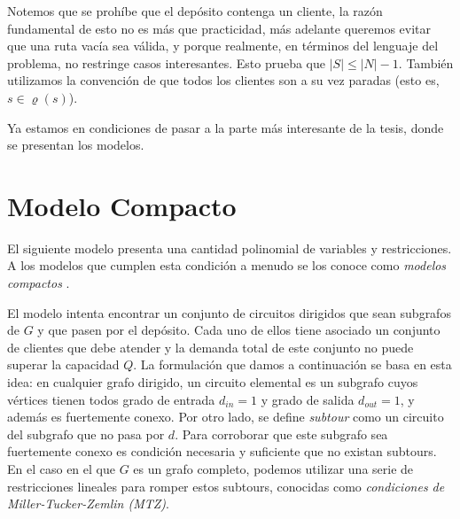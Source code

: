 Notemos que se prohíbe que el depósito contenga un cliente, la razón fundamental de esto no es más que practicidad, más adelante queremos evitar que una ruta vacía sea válida, y porque realmente, en términos del lenguaje del problema, no restringe casos interesantes. Esto prueba que $|S| \leq |N|-1$. También utilizamos la convención de que todos los clientes son a su vez paradas (esto es, $s \in \varrho(s)$). 

Ya estamos en condiciones de pasar a la parte más interesante de la tesis, donde se presentan los modelos.


\section{Modelo Compacto}
\label{section:compacto}

El siguiente modelo presenta una cantidad polinomial de variables y restricciones. A los modelos que cumplen esta condición a menudo se los conoce como \emph{modelos compactos} \cite[p.3]{lancia-serafini}.

El modelo intenta encontrar un conjunto de circuitos dirigidos que sean subgrafos de $G$ y que pasen por el depósito. Cada uno de ellos tiene asociado un conjunto de clientes que debe atender y la demanda total de este conjunto no puede superar la capacidad $Q$. La formulación que damos a continuación se basa en esta idea: en cualquier grafo dirigido, un circuito elemental es un subgrafo cuyos vértices tienen todos grado de entrada $d_{in} = 1$ y grado de salida $d_{out} = 1$, y además es fuertemente conexo. Por otro lado, se define \emph{subtour} como un circuito del subgrafo que no pasa por $d$. Para corroborar que este subgrafo sea fuertemente conexo es condición necesaria y suficiente que no existan subtours. En el caso en el que $G$ es un grafo completo, podemos utilizar una serie de restricciones lineales para romper estos subtours, conocidas como \emph{condiciones de Miller-Tucker-Zemlin (MTZ)}.  


